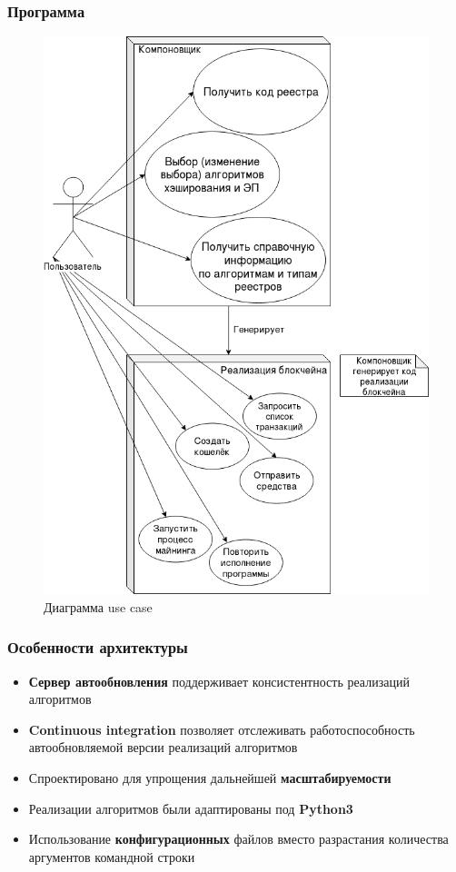 \documentclass{beamer}
\begin{document}
\begin{frame}
    \frametitle{Программа}
    \begin{figure}
        \includegraphics[height=0.75\textheight]{uc}
        \caption{Диаграмма use case}
    \end{figure}
\end{frame}

\begin{frame}
    \frametitle{Особенности архитектуры}
    \begin{itemize}
         \item \textbf{Сервер автообновления} поддерживает консистентность
              реализаций алгоритмов
         \item \textbf{Continuous integration} позволяет отслеживать
              работоспособность автообновляемой версии реализаций алгоритмов
        \item Спроектировано для упрощения дальнейшей \textbf{масштабируемости}
        \item Реализации алгоритмов были адаптированы под
              \textbf{Python3}
        \item Использование \textbf{конфигурационных} файлов вместо разрастания
              количества аргументов командной строки
    \end{itemize}
\end{frame}
\end{document}
